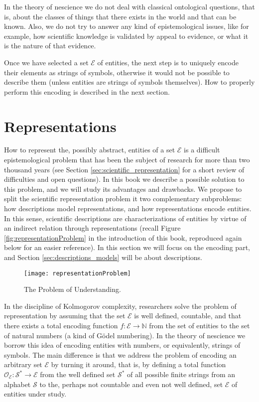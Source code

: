 In the theory of nescience we do not deal with classical ontological questions, that is, about the classes of things that there exists in the world and that can be known. Also, we do not try to answer any kind of epistemological issues, like for example, how scientific knowledge is validated by appeal to evidence, or what it is the nature of that evidence.

Once we have selected a set $\mathcal{E}$ of entities, the next step is to uniquely encode their elements as strings of symbols, otherwise it would not be possible to describe them (unless entities are strings of symbols themselves). How to properly perform this encoding is described in the next section.

%
%

\section{Representations}
\label{sec:representations}

How to represent the, possibly abstract, entities of a set $\mathcal{E}$ is a difficult epistemological problem that has been the subject of research for more than two thousand years (see Section \ref{sec:scientific_representation} for a short review of difficulties and open questions). In this book we describe a possible solution to this problem, and we will study its advantages and drawbacks. We propose to split the scientific representation problem it two complementary subproblems: how descriptions model representations, and how representations encode entities. In this sense, scientific descriptions are characterizations of entities by virtue of an indirect relation through representations (recall Figure \ref{fig:representationProblem} in the introduction of this book, reproduced again below for an easier reference). In this section we will focus on the encoding part, and Section \ref{sec:descriptions_models} will be about descriptions.

\begin{figure}[h]
\centering\texttt{[image: representationProblem]}
\caption{The Problem of Understanding.}
\end{figure}

In the discipline of Kolmogorov complexity, researchers solve the problem of representation by assuming that the set $\mathcal{E}$ is well defined, countable, and that there exists a total encoding function $f:\mathcal{E} \rightarrow \mathbb{N}$ from the set of entities to the set of natural numbers (a kind of Gödel numbering). In the theory of nescience we borrow this idea of encoding entities with numbers, or equivalently, strings of symbols. The main difference is that we address the problem of encoding an arbitrary set $\mathcal{E}$ by turning it around, that is, by defining a total function $\mathcal{O}_\mathcal{E}:\mathcal{S}^\ast \rightarrow \mathcal{E}$ from the well defined set $\mathcal{S}^\ast$ of all possible finite strings from an alphabet $\mathcal{S}$ to the, perhaps not countable and even not well defined, set $\mathcal{E}$ of entities under study.

